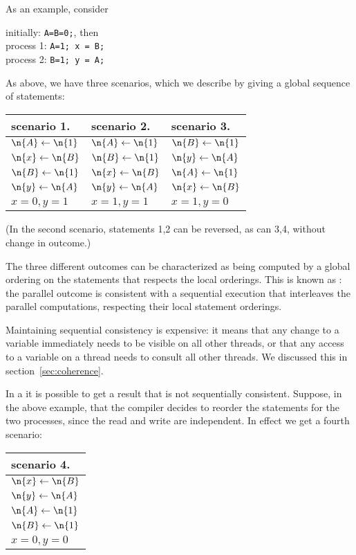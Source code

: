 As an example, consider
\begin{tabbing}
  initially: \texttt{A=B=0;}, then\\
  process 1: \texttt{A=1; x = B;}\\
  process 2: \texttt{B=1; y = A;}
\end{tabbing}

As above, we have three scenarios, which we describe by
giving a global sequence of statements:

\begin{tabular}{lll}
  \toprule
  scenario 1.& scenario 2.& scenario 3.\\
  \midrule
  $\n{A}\leftarrow \n{1}$&$\n{A}\leftarrow \n{1}$&$\n{B}\leftarrow \n{1}$\\
  $\n{x}\leftarrow \n{B}$&$\n{B}\leftarrow \n{1}$&$\n{y}\leftarrow \n{A}$\\
  $\n{B}\leftarrow \n{1}$&$\n{x}\leftarrow \n{B}$&$\n{A}\leftarrow \n{1}$\\
  $\n{y}\leftarrow \n{A}$&$\n{y}\leftarrow \n{A}$&$\n{x}\leftarrow \n{B}$\\
  \midrule
  $x=0, y=1$& $x=1,y=1$& $x=1,y=0$\\
  \bottomrule
\end{tabular}

(In the second scenario, statements 1,2 can be reversed, as can 3,4,
without change in outcome.)

The three different outcomes can be characterized as being computed by a global ordering
on the statements that respects the local orderings. This is known as : the parallel outcome is consistent with a sequential execution that
interleaves the parallel computations, respecting their local statement orderings.

Maintaining sequential consistency is expensive: it means that any change to a variable
immediately needs to be visible on all other threads, or that any access to a variable
on a thread
needs to consult all other threads. We discussed this in section~\ref{sec:coherence}.

In a  it is possible to get a result that
is not sequentially consistent. Suppose, in the above example,
that the compiler decides to reorder the
statements for the two processes, since the read and write are independent.
In effect we get a fourth scenario:

\begin{tabular}{l}
  \toprule
  scenario 4.\\
  \midrule
  $\n{x}\leftarrow \n{B}$\\
  $\n{y}\leftarrow \n{A}$\\
  $\n{A}\leftarrow \n{1}$\\
  $\n{B}\leftarrow \n{1}$\\
  \midrule
  $x=0, y=0$\\
  \bottomrule
\end{tabular}

